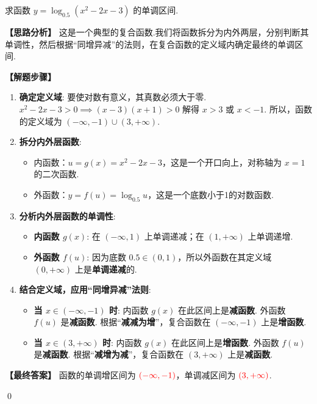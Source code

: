\begin{exercise}
	求函数 $y = \log_{0.5}(x^2-2x-3)$ 的单调区间.
\end{exercise}
\begin{solution}
	\textbf{【思路分析】}
	\textcolor{green!50!black}{这是一个典型的复合函数.我们将函数拆分为内外两层，分别判断其单调性，然后根据“同增异减”的法则，在复合函数的定义域内确定最终的单调区间.}
	
	\textbf{【解题步骤】}
	\begin{enumerate}
		\item \textbf{确定定义域}:
		要使对数有意义，其真数必须大于零.
		$x^2-2x-3 > 0 \implies (x-3)(x+1) > 0$
		解得 $x > 3$ 或 $x < -1$.
		所以，函数的定义域为 $(-\infty, -1) \cup (3, +\infty)$.
		
		\item \textbf{拆分内外层函数}:
		\begin{itemize}
			\item 内函数：$u = g(x) = x^2-2x-3$，这是一个开口向上，对称轴为 $x=1$ 的二次函数.
			\item 外函数：$y = f(u) = \log_{0.5} u$，这是一个底数小于1的对数函数.
		\end{itemize}
		
		\item \textbf{分析内外层函数的单调性}:
		\begin{itemize}
			\item \textbf{内函数 $g(x)$}:
			在 $(-\infty, 1)$ 上单调递减；在 $(1, +\infty)$ 上单调递增.
			\item \textbf{外函数 $f(u)$}:
			因为底数 $0.5 \in (0,1)$，所以外函数在其定义域 $(0, +\infty)$ 上是\textbf{单调递减}的.
		\end{itemize}
		
		\item \textbf{结合定义域，应用“同增异减”法则}:
		\begin{itemize}
			\item \textbf{当 $x \in (-\infty, -1)$ 时}:
			内函数 $g(x)$ 在此区间上是\textbf{减函数}.
			外函数 $f(u)$ 是\textbf{减函数}.
			根据“\textbf{减减为增}”，复合函数在 $(-\infty, -1)$ 上是\textbf{增函数}.
			
			\item \textbf{当 $x \in (3, +\infty)$ 时}:
			内函数 $g(x)$ 在此区间上是\textbf{增函数}.
			外函数 $f(u)$ 是\textbf{减函数}.
			根据“\textbf{减增为减}”，复合函数在 $(3, +\infty)$ 上是\textbf{减函数}.
		\end{itemize}
	\end{enumerate}
	\textbf{【最终答案】}
	函数的单调增区间为 $\textcolor{red}{(-\infty, -1)}$，单调减区间为 $\textcolor{red}{(3, +\infty)}$.
\end{solution}
\qed

